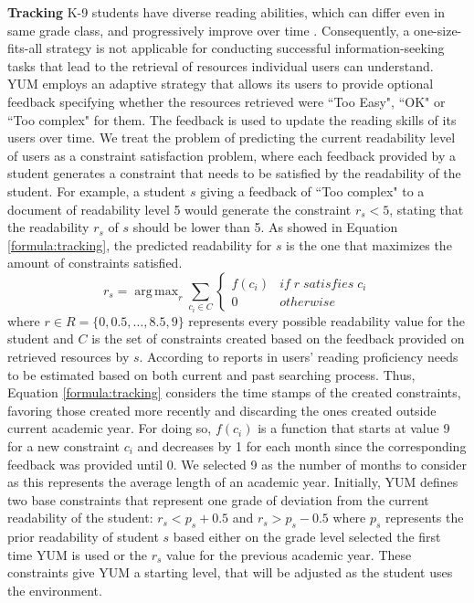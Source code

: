 \documentclass{sig-alternate-05-2015}
\DeclareMathOperator*{\argmaxA}{arg\,max} %
\begin{document}
\noindent
\textbf{Tracking} K-9 students have diverse reading abilities, which can differ even in same grade class, and progressively improve over time \cite{sh13}. Consequently, a one-size-fits-all strategy is not applicable for conducting successful information-seeking tasks that lead to the retrieval of resources individual users can understand. YUM employs an adaptive strategy that allows its users to provide optional feedback specifying whether the resources retrieved were ``Too Easy", ``OK" or ``Too complex" for them. The feedback is used to update the reading skills of its users over time.    
We treat the problem of predicting the current readability level of users as a constraint satisfaction problem, where each feedback  provided by a student  generates  a constraint that needs to be satisfied by the readability of the student. For example, a student $s$ giving a feedback of ``Too complex" to a document of readability level 5 would generate the constraint $r_s < 5$, stating that the readability $r_s$ of $s$ should be lower than 5. As showed in Equation \ref{formula:tracking}, the predicted readability for $s$ is the one that maximizes the amount of constraints satisfied.
\vspace{0.1cm}
\begin{equation}
r_s = \argmaxA_r  \sum_ {c_{i} \in C} \begin{cases}f(c_{i}) & if \; r \;  satisfies \; c_{i}\\0 & otherwise\end{cases}  
\label{formula:tracking}
\end{equation}
\noindent
where $r \in R=\{0,0.5,\dotsc ,8.5,9\}$ represents every possible readability value for the student and $C$ is the set of constraints created based on the feedback provided on retrieved resources by $s$. According to reports in \cite{Col11} users' reading proficiency needs to be estimated based on both current and past searching process. Thus, Equation \ref{formula:tracking} considers the time stamps of the created constraints, favoring those created more recently and discarding the ones created outside current academic year. For doing so, $f(c_i)$ is a function  that starts at value 9 for a new constraint $c_i$ and decreases by 1 for each month since the corresponding feedback was provided until 0. We selected 9 as the number of months to consider as this represents the average length of an academic year.%
Initially, YUM defines two base constraints that represent one grade of deviation from the current readability of the student: $r_s < p_s+0.5$ and $r_s > p_s -0.5$ where $p_s$ represents the prior readability of student $s$ based either on the grade level selected the first time YUM is used or the $r_s$ value for the previous academic year. These constraints give YUM a starting level, that will be adjusted as the student uses the environment. 
\end{document}
